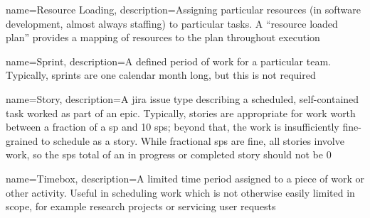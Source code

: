 {
 name={Resource Loading},
 description={Assigning particular resources (in software development, almost always staffing) to particular tasks.
              A ``resource loaded plan'' provides a mapping of resources to the plan throughout execution}
}



{
 name=Sprint,
 description={A defined period of work for a particular team.
               Typically, sprints are one calendar month long, but this is not required}
}


{
 name=Story,
 description={A \gls{jira} issue type describing a scheduled, self-contained task worked as part of an \gls{epic}.
              Typically, stories are appropriate for work worth between a fraction of a \gls{sp} and 10 \glspl{sp}; beyond that, the work is insufficiently fine-grained to schedule as a story.
              While fractional \glspl{sp} are fine, all stories involve work, so the \glspl{sp} total of an in progress or completed story should not be 0}
}



{
 name=Timebox,
 description={A limited time period assigned to a piece of work or other activity.
              Useful in scheduling work which is not otherwise easily limited in scope, for example research projects or servicing user requests}
}

